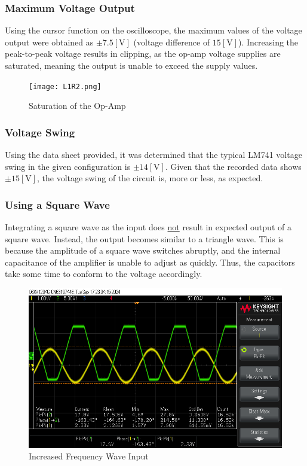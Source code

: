\documentclass[
	letterpaper, %
	10pt, %
]{CSUniSchoolLabReport}
\begin{document}
\subsubsection{Maximum Voltage Output}

Using the cursor function on the oscilloscope, the maximum values of the voltage output were obtained as $\pm7.5[\si{\volt}]$ (voltage difference of $15[\si{\volt}]$). Increasing the peak-to-peak voltage results in clipping, as the op-amp voltage supplies are saturated, meaning the output is unable to exceed the supply values.

\begin{figure}[H]
  \centering
  \texttt{[image: L1R2.png]}
  \caption{Saturation of the Op-Amp}
  \label{fig:5}
\end{figure}

\subsubsection{Voltage Swing}

Using the data sheet provided, it was determined that the typical LM741 voltage swing in the given configuration is $\pm14[\si{\volt}]$. Given that the recorded data shows $\pm15[\si{\volt}]$, the voltage swing of the circuit is, more or less, as expected.

\subsubsection{Using a Square Wave}

Integrating a square wave as the input does \underline{not} result in expected output of a square wave. Instead, the output becomes similar to a triangle wave. This is because the amplitude of a square wave switches abruptly, and the internal capacitance of the amplifier is unable to adjust as quickly. Thus, the capacitors take some time to conform to the voltage accordingly.

\begin{figure}[H]
  \centering
  \includegraphics[width=.9\textwidth]{Figures/L1R3.png}
  \caption{Increased Frequency Wave Input}
  \label{fig:6}
\end{figure}
\end{document}
